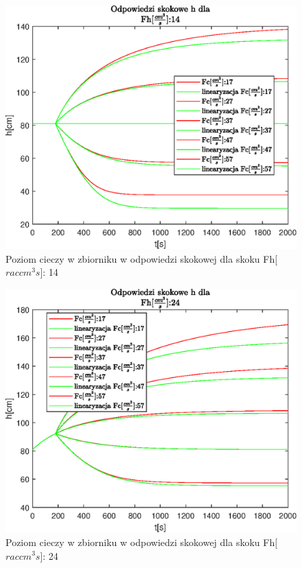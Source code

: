 \begin{figure}[h!]
   \centering
   \includegraphics{img/step-responses/h/stepResponseHFh14.eps}
   \caption{Poziom cieczy w zbiorniku w odpowiedzi skokowej dla skoku Fh[$rac{cm^3}{s}$]: 14}
   \label{fig:stepResponseHFh14}
\end{figure}
            
\begin{figure}[h!]
   \centering
   \includegraphics{img/step-responses/h/stepResponseHFh24.eps}
   \caption{Poziom cieczy w zbiorniku w odpowiedzi skokowej dla skoku Fh[$rac{cm^3}{s}$]: 24}
   \label{fig:stepResponseHFh24}
\end{figure}
            
